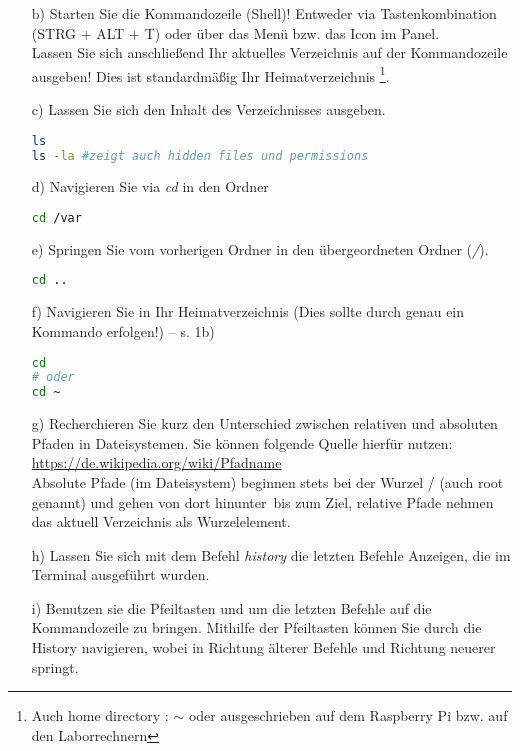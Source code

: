 \documentclass[paper=a4,fontsize=11pt]{scrartcl}%
\numberwithin{equation}{section}
\begin{document}
{\begin{enumerate}
\begin{itemize}
Anmerkung: Einige Aufgaben benötigen mehr als nur genau ein Kommando!
		\item[b)] Starten Sie die Kommandozeile (Shell)! Entweder via Tastenkombination  (STRG + ALT + T) oder über das Menü bzw. das Icon im Panel.\\
		Lassen Sie sich anschließend Ihr aktuelles Verzeichnis auf der Kommandozeile ausgeben! Dies ist standardmäßig Ihr Heimatverzeichnis \footnote{Auch \glqq home directory \grqq: $\sim$ oder ausgeschrieben  auf dem Raspberry Pi bzw.  auf den Laborrechnern}.
		\item[c)] Lassen Sie sich den Inhalt des Verzeichnisses ausgeben.
		\begin{lstlisting}[style=Bash, language=Bash]
ls
ls -la #zeigt auch hidden files und permissions
		\end{lstlisting}
		\item[d)] Navigieren Sie via \emph{cd} in den Ordner 
		\begin{lstlisting}[style=Bash, language=Bash]
cd /var
		\end{lstlisting}
		\item[e)] Springen Sie vom vorherigen Ordner in den übergeordneten Ordner (\emph{/}).
		\begin{lstlisting}[style=Bash, language=Bash]
cd .. 
	\end{lstlisting}
		\item[f)] Navigieren Sie in Ihr Heimatverzeichnis (Dies sollte durch genau ein Kommando erfolgen!) -- s. 1b)
\begin{lstlisting}[style=Bash, language=Bash]
cd 
# oder
cd ~
		\end{lstlisting}
		\item[g)] Recherchieren Sie kurz den Unterschied zwischen relativen und absoluten Pfaden in Dateisystemen. Sie können folgende Quelle hierfür nutzen: \url{https://de.wikipedia.org/wiki/Pfadname}\\
		Absolute Pfade (im Dateisystem) beginnen stets bei der Wurzel / (auch root genannt) und gehen von dort \glqq hinunter\grqq\ bis zum Ziel, relative Pfade nehmen das aktuell Verzeichnis als Wurzelelement.
		\item[h)] Lassen Sie sich mit dem Befehl \emph{history} die letzten Befehle Anzeigen, die im Terminal ausgeführt wurden. 
		\item[i)] Benutzen sie die Pfeiltasten \keys{\arrowkeyup} und \keys{\arrowkeydown} um die letzten Befehle auf die Kommandozeile zu bringen. Mithilfe der Pfeiltasten können Sie durch die History navigieren, wobei \keys{\arrowkeyup} in Richtung älterer Befehle und \keys{\arrowkeydown} Richtung neuerer springt.

\end{itemize}
\end{enumerate}}
\end{document}
